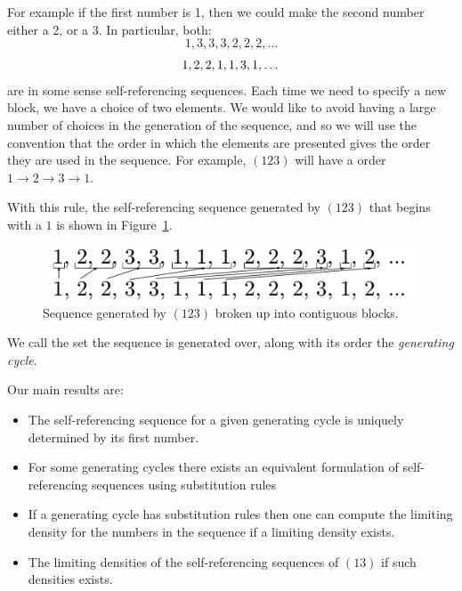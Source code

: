\documentclass[runningheads,a4paper]{llncs}
\begin{document}
For example if the first number is 1, then we could make the second number either a 2, or a 3. In particular, both:
\begin{equation}
1, 3, 3, 3, 2, 2, 2, \dots
\end{equation}
\begin{equation}
1, 2, 2, 1, 1, 3, 1, \dots\\
\end{equation}
are in some sense self-referencing sequences.
Each time we need to specify a new block, we have a choice of two elements. We would like to avoid having a large number of choices in the generation of the sequence, and so we will use the convention that the order in which the elements are presented gives the order they are used in the sequence. 
For example, $(123 )$ will have a order $1 \rightarrow 2 \rightarrow 3 \rightarrow 1$. 

With this rule, the self-referencing sequence generated by $(123)$ that begins with a $1$ is shown in Figure~\ref{fig:onetwothree}.
\begin{figure}
\label{fig:onetwothree}
\center
\includegraphics[width=0.4\linewidth]{sequenceBlocks123}
\caption{Sequence generated by $(123)$ broken up into contiguous blocks.}
\end{figure}

We call the set the sequence is generated over, along with its order the \emph{generating cycle}.

Our main results are:
\begin{itemize}
\item The self-referencing sequence for a given generating cycle is uniquely determined by its first number.
%
\item For some generating cycles there exists an equivalent formulation of self-referencing sequences using substitution rules
\item If a generating cycle has substitution rules then one can compute the limiting density for the numbers in the sequence if a limiting density exists.
\item The limiting densities of the self-referencing sequences of  $(13)$ if such densities exists.
\end{itemize}
\end{document}
